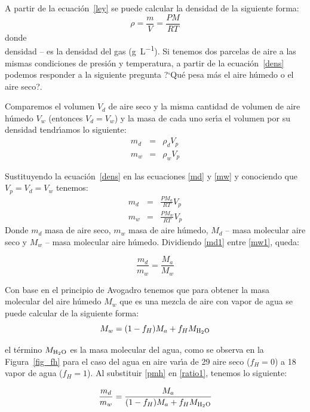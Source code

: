  A partir de la ecuaci\'on~\ref{ley} se puede calcular la densidad de la siguiente forma:
\begin{equation}
\rho=\frac{m}{V}=\frac{PM}{RT}
\label{dens}
\end{equation}
donde\\\gls{densidad} -- es la densidad del gas (\si{\gram\per\liter}).  Si tenemos dos parcelas de aire a las mismas condiciones de presi\'on y temperatura, a partir de la ecuaci\'on~\ref{dens} podemos responder a la siguiente pregunta ?`Qu\'e pesa m\'as el aire h\'umedo o el aire seco?.

Comparemos el volumen $V_d$ de aire seco y la misma cantidad de volumen de aire h\'umedo $V_w$ (entonces $V_d=V_w$) y la masa de cada uno ser\'{\i}a el volumen por su densidad tendr\'{\i}amos lo siguiente:
\begin{eqnarray}
m_d &= &\rho_d V_p \label{md}\\
 m_w & = & \rho_wV_p \label{mw}
\end{eqnarray}

Sustituyendo la ecuaci\'on~\ref{dens} en las ecuaciones \ref{md} y \ref{mw} y  conociendo que $V_p=V_d=V_w$ tenemos:
\begin{eqnarray}
m_d &= &\frac{PM_a}{RT}V_p \label{md1}\\
 m_w & = &\frac{PM_w}{RT}V_p \label{mw1} 
\end{eqnarray}
Donde $m_d$ masa de aire seco, $m_w$ masa de aire h\'umedo, $M_d$ -- masa molecular aire seco y $M_w$ -- masa molecular aire h\'umedo. Dividiendo  \ref{md1} entre  \ref{mw1}, queda:

\begin{equation}
\frac{m_d}{m_w}=\frac{M_a}{M_w} 
\label{ratio1}
\end{equation}

Con base en el principio de Avogadro tenemos que para obtener la masa molecular  del aire h\'umedo $M_w$ que es una mezcla de aire con vapor de agua se puede calcular de la siguiente forma:
\begin{equation}
M_w= (1-f_H)M_a + f_H M_{\ce{H2O}}
\label{pmh}
\end{equation}

el t\'ermino $M_{\ce{H2O}}$ es la masa molecular del agua, como se observa en la Figura~\ref{fig_fh} para el caso del agua en aire var\'{\i}a de 29 aire seco ($f_H=0$) a 18 vapor de agua ($f_H=1$). Al substituir \ref{pmh} en \ref{ratio1}, tenemos lo siguiente:


\begin{equation}
\frac{m_d}{m_w}=\frac{M_a}{(1-f_H)M_a + f_H M_{\ce{H2O}}} 
\label{ratio2}
\end{equation}

